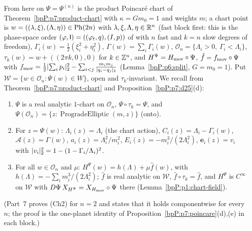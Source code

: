 From here on $\Psi=\Psi^{(n)}$ is the product Poincar\'e chart of Theorem~\ref{bpP:p7:product-chart} with $\kappa=Gm_0=1$ and weights $m$; a chart point is $w=((\lambda,\xi),(\Lambda,\eta))\in\mathrm{Ph}(2n)$ with $\lambda,\xi,\Lambda,\eta\in\mathbb{R}^n$
(fast block first: this is the phase-space order $(\varphi,\mathsf I)=((\varphi_{\rm f},q),(I,p))$ of  with $n$ fast and $k=n$ slow degrees of freedom), $\Gamma_i(w)=\frac12(\xi_i^2+\eta_i^2)$, $\Gamma(w)=\sum_i\Gamma_i(w)$,
$\mathcal O_n=\{\Lambda_i>0,\ \Gamma_i<\Lambda_i\}$, $\tau_k(w)=w+((2\pi k,0),0)$ for $k\in\mathbb{Z}^n$, and $H^\Psi=H_{\rm mov}\circ\Psi$, $\hat f=f_{\rm mov}\circ\Psi$ with $f_{\rm mov}=\frac12\lvert \sum_ip_i\rvert_2^2-\sum_{i<j}\frac{m_im_j}{\lvert q_i-q_j\rvert_2}$ (Lemma~\ref{bpP:p6:split}, $G=m_0=1$).
Put $\mathcal W=\{w\in\mathcal O_n:\Psi(w)\in W\}$, open and $\tau_k$-invariant. We recall from Theorem~\ref{bpP:p7:product-chart} and Proposition~\ref{bpP:p7:d25}(d):
\begin{enumerate}[label=(Ch\arabic*),ref=(Ch\arabic*)]
\item\label{bpP:p14:ch-chart} $\Psi$ is a real analytic $1$-chart on $\mathcal O_n$, $\Psi\circ\tau_k=\Psi$, and $\Psi(\mathcal O_n)=\{z:\operatorname{ProgradeElliptic}(m,z)\}$ (onto).
\item\label{bpP:p14:ch-elements} For $z=\Psi(w)$: $\Lambda_i(z)=\Lambda_i$ (the chart action), $C_i(z)=\Lambda_i-\Gamma_i(w)$, $\mathcal A(z)=\Gamma(w)$, $a_i(z)=\Lambda_i^2/m_i^2$, $E_i(z)=-m_i^3/(2\Lambda_i^2)$, $\mathbf e_i(z)=v_i$ with $\lvert v_i\rvert_2^2=1-(1-\Gamma_i/\Lambda_i)^2$.
\item\label{bpP:p14:ch-split} For all $w\in\mathcal O_n$ and $\mu$: $H^\Psi(w)=h(\Lambda)+\mu\hat f(w)$, with $h(\Lambda)=-\sum_im_i^3/(2\Lambda_i^2)$; $\hat f$ is real analytic on $\mathcal W$, $\hat f\circ\tau_k=\hat f$, and $H^\Psi$ is $C^\infty$ on $\mathcal W$ with $D\Psi\,X_{H^\Psi}=X_{H_{\rm mov}}\circ\Psi$ there (Lemma~\ref{bpP:p1:chart-field}).
\end{enumerate}
(Part~7 proves (Ch2) for $n=2$ and states that it holds componentwise for every $n$; the proof is the one-planet identity of Proposition~\ref{bpP:p7:poincare}(d),(e) in each block.)

